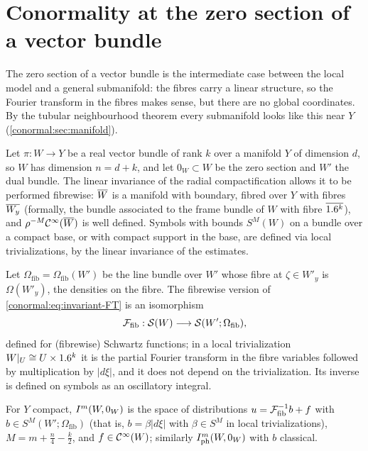 \section{Conormality at the zero section of a vector bundle}\label{conormal:sec:bundle}

The zero section of a vector bundle is the intermediate case between the local
model and a general submanifold: the fibres carry a linear structure, so the
Fourier transform in the fibres makes sense, but there are no global
coordinates. By the tubular neighbourhood theorem every submanifold looks like
this near $Y$ (\cref{conormal:sec:manifold}).

Let $\pi:W\to Y$ be a real vector bundle of rank $k$ over a manifold $Y$ of
dimension $d$, so $W$ has dimension $n=d+k$, and let $0_W\subset W$ be the zero
section and $W'$ the dual bundle.  The linear invariance of the radial
compactification allows it to be performed fibrewise: $\overline{W}$ is a manifold with
boundary, fibred over $Y$ with fibres $\overline{W_y}$ (formally, the bundle associated
to the frame bundle of $W$ with fibre $\overline{1.6^k}$), and $\rho^{-M}\mathcal{C}^\infty(\overline{W})$
is well defined.  Symbols with bounds $S^M(W)$ on a bundle over a compact base,
or with compact support in the base, are defined via local trivializations, by
the linear invariance of the estimates.

Let $\Omega_{\mathrm{fib}}=\Omega_{\mathrm{fib}}(W')$ be the line bundle over
$W'$ whose fibre at $\zeta\in W'_y$ is $\Omega(W'_y)$, the densities on the fibre.
The fibrewise version of \eqref{conormal:eq:invariant-FT} is an isomorphism
\begin{equation*}
  \mathcal{F}_{\mathrm{fib}}:\mathcal{S}(W)\longrightarrow\mathcal{S}(W';\Omega_{\mathrm{fib}}),
\end{equation*}
defined for (fibrewise) Schwartz functions; in a local trivialization
$W|_U\cong U\times1.6^k$ it is the partial Fourier transform in the fibre
variables followed by multiplication by $|d\xi|$, and it does not depend on the
trivialization.  Its inverse is defined on symbols as an oscillatory integral.

\begin{definition}\label{conormal:def:bundle}
  For $Y$ compact, $I^{m}(W,0_W)$ is the space of distributions $u=\mathcal{F}_{\mathrm{fib}}^{-1}b+f$
  with $b\in S^{M}(W';\Omega_{\mathrm{fib}})$ (that is, $b=\beta|d\xi|$ with
  $\beta\in S^M$ in local trivializations), $M=m+\frac n4-\frac k2$, and
  $f\in\mathcal{C}^\infty(W)$; similarly $I^{m}_{\mathrm{ph}}(W,0_W)$ with $b$ classical.
\end{definition}

